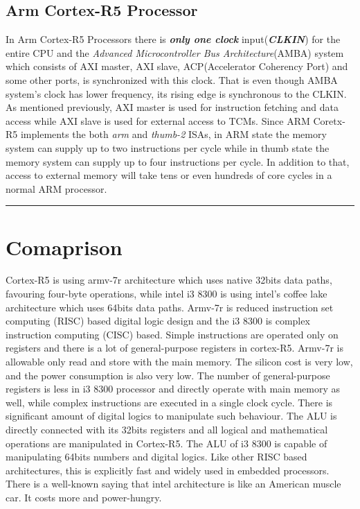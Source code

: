 \documentclass[a4paper,11pt]{article}
\begin{document}
\subsection{Arm Cortex-R5 Processor}
In Arm Cortex-R5 Processors there is \textbf{\textit{only one clock}} input(\textbf{\textit{CLKIN}}) for the entire CPU and the \textit{Advanced Microcontroller Bus Architecture}(AMBA) system which consists of AXI master, AXI slave, ACP(Accelerator Coherency Port) and some other ports, is synchronized with this clock. That is even though AMBA system's clock has lower frequency, its rising edge is synchronous to the CLKIN. As mentioned previously, AXI master is used for instruction fetching and data access while AXI slave is used for external access to TCMs. Since ARM Coretx-R5 implements the both \textit{arm} and \textit{thumb-2} ISAs, in ARM state the memory system can supply up to two instructions per cycle while in thumb state the memory system can supply up to four instructions per cycle. In addition to that, access to external memory will take tens or even hundreds of core cycles in a normal ARM processor.




\vspace{1cm}\hrule

\section{Comaprison}

Cortex-R5 is using armv-7r architecture which uses native 32bits data paths, favouring four-byte operations, while intel i3 8300 is using intel’s coffee lake architecture which uses 64bits data paths. Armv-7r is reduced instruction set computing (RISC) based digital logic design and the i3 8300 is complex instruction computing (CISC) based. Simple instructions are operated only on registers and there is a lot of general-purpose registers in cortex-R5. Armv-7r is allowable only read and store with the main memory. The silicon cost is very low, and the power consumption is also very low. The number of general-purpose registers is less in i3 8300 processor and directly operate with main memory as well, while complex instructions are executed in a single clock cycle. There is significant amount of digital logics to manipulate such behaviour. The ALU is directly connected with its 32bits registers and all logical and mathematical operations are manipulated in Cortex-R5. The ALU of i3 8300 is capable of manipulating 64bits numbers and digital logics.  Like other RISC based architectures, this is explicitly fast and widely used in embedded processors. There is a well-known saying that intel architecture is like an American muscle car. It costs more and power-hungry.\\
\end{document}
